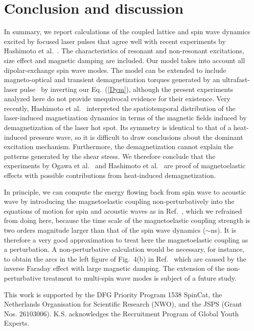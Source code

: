 \documentclass[aps,prb,twocolumn,superscriptaddress,floatfix]{revtex4}%
\begin{document}
\section{Conclusion and discussion} 
In summary, we report calculations of the coupled lattice and  spin wave dynamics excited by focused laser pulses that agree well with recent experiments  by Hashimoto et al.~\cite{Hashimoto17,Hashimoto2017b}. The characteristics of resonant and non-resonant excitations, size effect and magnetic damping are included. Our model takes into account all dipolar-exchange spin wave modes. The model can be extended to include magneto-optical and transient demagnetization torques
generated by an ultrafast-laser pulse~\cite{Kimel05,Satoh12,Au13} by inverting our Eq.~(\ref{Dym}), although the present experiments 
analyzed here
do not provide unequivocal evidence for their existence. Very recently, Hashimoto et al.~\cite{Hashimoto2017c} interpreted the spatiotemporal distribution of the laser-induced magnetization dynamics in terms of the magnetic fields induced by demagnetization of the laser hot spot. Its symmetry is identical to that of a heat-induced pressure wave, so it is difficult to draw conclusions about the dominant excitation mechanism. Furthermore, the demagnetization cannot explain the patterns generated by the shear stress. We therefore conclude that the experiments by Ogawa et al.~\cite{Ogawa15} and Hashimoto et al.~\cite{Hashimoto17,Hashimoto2017b,Hashimoto2017c} are proof of magnetoelastic effects with possible contributions from heat-induced demagnetization. 

In principle, we can compute the energy flowing back from spin wave to acoustic wave by introducing the magnetoelastic coupling  non-perturbatively into the equations of motion for spin and acoustic waves as in Ref.~\cite{Shen15}, which we refrained from doing here, because the time scale of the magnetoelastic coupling strength is two orders magnitude larger than that of the spin wave dynamics ($\sim$ns). It is therefore a very good approximation to treat here the magnetoelastic coupling as a perturbation. A non-perturbative calculation would be necessary, for instance, to obtain the arcs in the left figure of Fig.~4(b) in Ref.~\cite{Shen15} which are caused by the inverse Faraday effect with large magnetic damping. The extension of the non-perturbative treatment to multi-spin wave modes is subject of a future study.

\begin{acknowledgements}
This work is supported by the DFG Priority Program 1538 SpinCat, the Netherlands Organisation for Scientific Research (NWO), and the JSPS (Grant Nos. 26103006). K.S. acknowledges the Recruitment Program of Global Youth Experts. 
\end{acknowledgements}


\end{document}
